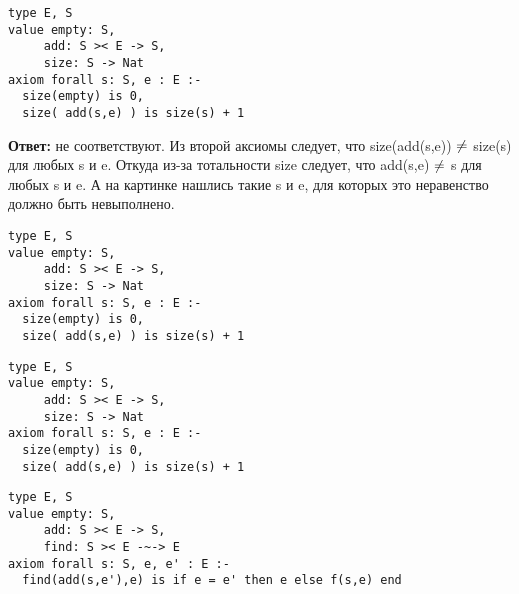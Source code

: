 \z \begin{lstlisting}
type E, S
value empty: S,
     add: S >< E -> S,
     size: S -> Nat
axiom forall s: S, e : E :-
  size(empty) is 0,
  size( add(s,e) ) is size(s) + 1
\end{lstlisting}

\MediumPicture{}

\textbf{Ответ:} не соответствуют. Из второй аксиомы следует, что size(add(s,e)) $\neq$ size(s) для любых s и e. Откуда из-за тотальности size следует, что add(s,e) $\neq$ s для любых s и e. А на картинке нашлись такие s и e, для которых это неравенство должно быть невыполнено.


\z \begin{lstlisting}
type E, S
value empty: S,
     add: S >< E -> S,
     size: S -> Nat
axiom forall s: S, e : E :-
  size(empty) is 0,
  size( add(s,e) ) is size(s) + 1
\end{lstlisting}

\MediumPicture{}

\z \begin{lstlisting}
type E, S
value empty: S,
     add: S >< E -> S,
     size: S -> Nat
axiom forall s: S, e : E :-
  size(empty) is 0,
  size( add(s,e) ) is size(s) + 1
\end{lstlisting}

\MediumPicture{}


\z \begin{lstlisting}
type E, S
value empty: S,
     add: S >< E -> S,
     find: S >< E -~-> E
axiom forall s: S, e, e' : E :-
  find(add(s,e'),e) is if e = e' then e else f(s,e) end
\end{lstlisting}

\MediumPicture{}

